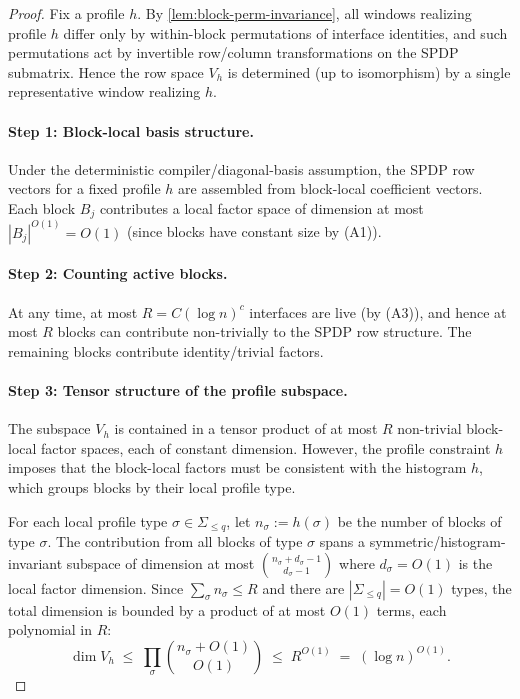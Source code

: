 \documentclass[12pt]{article}
\theoremstyle{definition}
\theoremstyle{remark}
\begin{document}
\begin{proof}
Fix a profile $h$. By \ref{lem:block-perm-invariance}, all windows realizing
profile $h$ differ only by within-block permutations of interface identities, and
such permutations act by invertible row/column transformations on the SPDP submatrix.
Hence the row space $V_h$ is determined (up to isomorphism) by a single representative
window realizing $h$.

\paragraph{Step 1: Block-local basis structure.}
Under the deterministic compiler\slash diagonal-basis assumption, the SPDP row vectors for
a fixed profile $h$ are assembled from block-local coefficient vectors. Each block
$B_j$ contributes a local factor space of dimension at most $|B_j|^{O(1)}=O(1)$
(since blocks have constant size by (A1)).

\paragraph{Step 2: Counting active blocks.}
At any time, at most $R=C(\log n)^c$ interfaces are live (by (A3)), and hence at most
$R$ blocks can contribute non-trivially to the SPDP row structure. The remaining blocks
contribute identity/trivial factors.

\paragraph{Step 3: Tensor structure of the profile subspace.}
The subspace $V_h$ is contained in a tensor product of at most $R$ non-trivial
block-local factor spaces, each of constant dimension. However, the profile constraint
$h$ imposes that the block-local factors must be consistent with the histogram $h$,
which groups blocks by their local profile type.

For each local profile type $\sigma\in\Sigma_{\le q}$, let $n_\sigma:=h(\sigma)$ be
the number of blocks of type $\sigma$. The contribution from all blocks of type
$\sigma$ spans a symmetric/histogram-invariant subspace of dimension at most
$\binom{n_\sigma + d_\sigma - 1}{d_\sigma - 1}$ where $d_\sigma=O(1)$ is the local
factor dimension. Since $\sum_\sigma n_\sigma \le R$ and there are $|\Sigma_{\le q}|=O(1)$
types, the total dimension is bounded by a product of at most $O(1)$ terms, each
polynomial in $R$:
\[
\dim V_h \;\le\; \prod_{\sigma} \binom{n_\sigma + O(1)}{O(1)} \;\le\; R^{O(1)} \;=\; (\log n)^{O(1)}.
\]
\end{proof}
\end{document}
